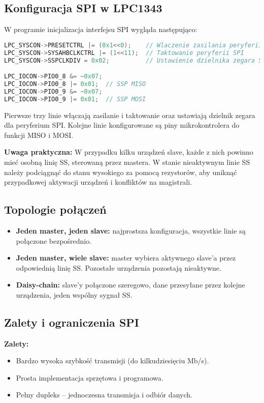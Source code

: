 \documentclass[a4paper,12pt]{report}
\begin{document}
\subsection{Konfiguracja SPI w LPC1343}

W programie inicjalizacja interfejsu SPI wygląda następująco:
\begin{lstlisting}[language=C]
LPC_SYSCON->PRESETCTRL |= (0x1<<0);    // Wlaczenie zasilania peryferii SPI
LPC_SYSCON->SYSAHBCLKCTRL |= (1<<11);  // Taktowanie peryferii SPI
LPC_SYSCON->SSPCLKDIV = 0x02;          // Ustawienie dzielnika zegara SPI

LPC_IOCON->PIO0_8 &= ~0x07;
LPC_IOCON->PIO0_8 |= 0x01;  // SSP MISO
LPC_IOCON->PIO0_9 &= ~0x07;
LPC_IOCON->PIO0_9 |= 0x01;  // SSP MOSI
\end{lstlisting}
Pierwsze trzy linie włączają zasilanie i taktowanie oraz ustawiają dzielnik zegara dla peryferium SPI. Kolejne linie konfigurowane są piny mikrokontrolera do funkcji MISO i MOSI.

\textbf{Uwaga praktyczna:} W przypadku kilku urządzeń slave, każde z nich powinno mieć osobną linię SS, sterowaną przez mastera. W stanie nieaktywnym linie SS należy podciągnąć do stanu wysokiego za pomocą rezystorów, aby uniknąć przypadkowej aktywacji urządzeń i konfliktów na magistrali.

\subsection{Topologie połączeń}

\begin{itemize}
    \item \textbf{Jeden master, jeden slave:} najprostsza konfiguracja, wszystkie linie są połączone bezpośrednio.
    \item \textbf{Jeden master, wiele slave:} master wybiera aktywnego slave'a przez odpowiednią linię SS. Pozostałe urządzenia pozostają nieaktywne.
    \item \textbf{Daisy-chain:} slave'y połączone szeregowo, dane przesyłane przez kolejne urządzenia, jeden wspólny sygnał SS.
\end{itemize}

\subsection*{Zalety i ograniczenia SPI}

\textbf{Zalety:}
\begin{itemize}
    \item Bardzo wysoka szybkość transmisji (do kilkudziesięciu Mb/s).
    \item Prosta implementacja sprzętowa i programowa.
    \item Pełny dupleks – jednoczesna transmisja i odbiór danych.
\end{itemize}
\end{document}
